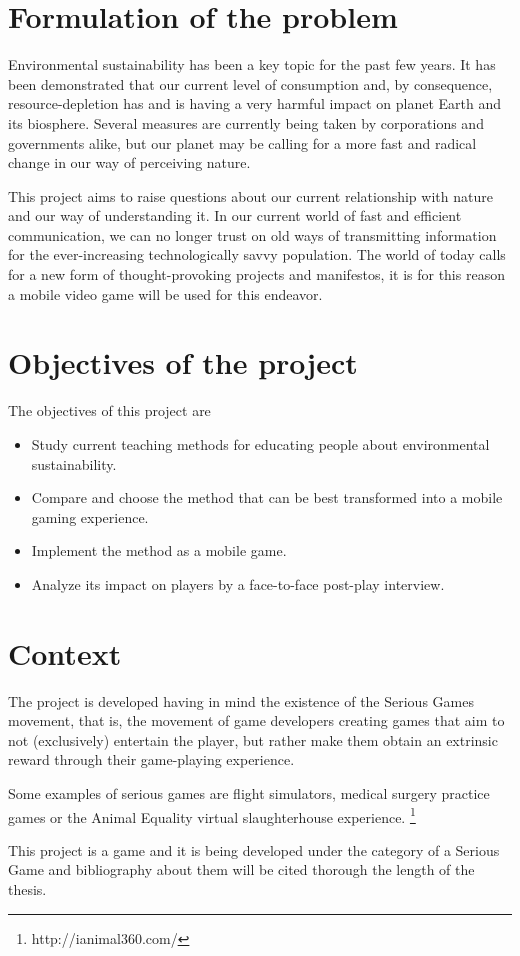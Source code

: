 \section{Formulation of the problem}

Environmental sustainability has been a key topic for the past few years. It has been demonstrated
\cite{stateofglobalair}
that our current level of consumption and, by consequence, resource-depletion has and is having a very harmful impact on planet Earth and its biosphere. Several measures are currently being taken
\cite{climatechangepolicies}
by corporations and governments alike, but our planet may be calling for a more fast and radical change in our way of perceiving nature.

This project aims to raise questions about our current relationship with nature and our way of understanding it. In our current world of fast and efficient communication, we can no longer trust on old ways of transmitting information
\cite{teensdontread}
for the ever-increasing technologically savvy population. The world of today calls for a new form of thought-provoking projects and manifestos, it is for this reason a mobile video game will be used for this endeavor.

\section{Objectives of the project}

The objectives of this project are

\begin{itemize}
	\item Study current teaching methods for educating people about environmental sustainability.
    \item Compare and choose the method that can be best transformed into a mobile gaming experience.
    \item Implement the method as a mobile game.
    \item Analyze its impact on players by a face-to-face post-play interview.
\end{itemize}

\section{Context}

The project is developed having in mind the existence of the Serious Games movement, that is, the movement of game developers creating games that aim to not (exclusively) entertain the player, but rather make them obtain an extrinsic reward through their game-playing experience.

Some examples of serious games are flight simulators, medical surgery practice games or the Animal Equality virtual slaughterhouse experience.
\footnote{http://ianimal360.com/}

This project is a game and it is being developed under the category of a Serious Game and bibliography about them will be cited thorough the length of the thesis.
